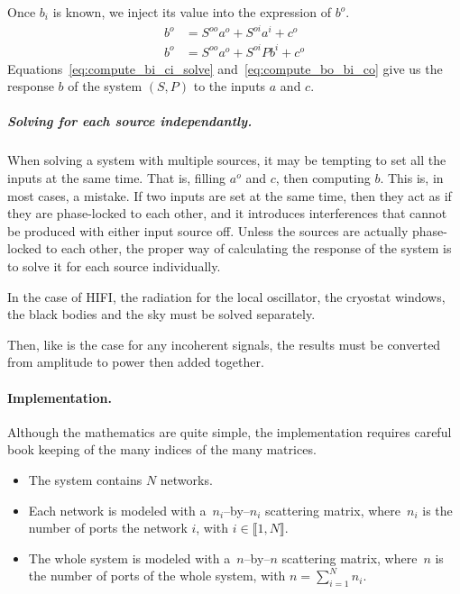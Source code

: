 Once $b_i$ is known, we inject its value into the expression of $b^o$.
\begin{subequations}
    \begin{align}
        b^o &= S^{oo} a^o + S^{oi} a^i + c^o \label{eq:compute_bo_ai_co}\\
        b^o &= S^{oo} a^o + S^{oi} Pb^i + c^o \label{eq:compute_bo_bi_co}
    \end{align}
    \label{eq:compute_bo_co}
\end{subequations}
Equations~\cref{eq:compute_bi_ci_solve} and~\cref{eq:compute_bo_bi_co} give us the response $b$ of the system $(S, P)$ to the inputs $a$ and $c$.

\subparagraph{Solving for each source independantly.}
When solving a system with multiple sources, it may be tempting to set all the inputs at the same time.
That is, filling $a^o$ and $c$, then computing $b$.
This is, in most cases, a mistake.
If two inputs are set at the same time, then they act as if they are phase-locked to each other, and it introduces interferences that cannot be produced with either input source off.
Unless the sources are actually phase-locked to each other, the proper way of calculating the response of the system is to solve it for each source individually.

In the case of HIFI, the radiation for the local oscillator, the cryostat windows, the black bodies and the sky must be solved separately.

Then, like is the case for any incoherent signals, the results must be converted from amplitude to power then added together.

\paragraph{Implementation.}
Although the mathematics are quite simple, the implementation requires careful book keeping of the many indices of the many matrices.

\begin{itemize}
    \item 
The system contains $N$ networks.
    \item 
Each network is modeled with a~$n_i$--by--$n_i$ scattering matrix, where~$n_i$ is the number of ports the network $i$, with $i \in \llbracket 1, N \rrbracket$.
    \item 
The whole system is modeled with a~$n$--by--$n$ scattering matrix, where~$n$ is the number of ports of the whole system, with $n = \sum_{i=1}^N n_i$.
\end{itemize}

